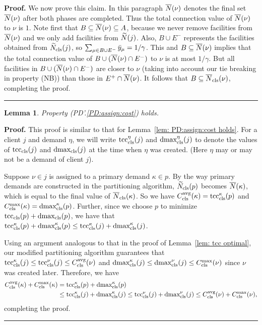 \documentclass[oneside,final]{ucr}
\newtheorem{lemma}[theorem]{Lemma}
\newenvironment{proof}[1][Proof]{\textbf{#1.} }{\ \rule{0.5em}{0.5em}}
\begin{document}
\begin{proof}
  We now prove this claim. In this paragraph $\wbarN(\nu)$ denotes the
  final set $\wbarN(\nu)$ after both phases are completed. Thus the total
connection value of $\wbarN(\nu)$ to $\nu$ is $1$.
	Note first that
  $B\subseteq \wbarN(\nu) \subseteq A$, because we never remove
  facilities from $\wbarN(\nu)$ and we only add facilities from
  $\wtildeN(j)$.  Also, $B\cup E^-$ represents the facilities obtained
  from $\wtildeclsnb(j)$, so $\sum_{\mu\in B\cup E^-} \bary_{\mu} =
  1/\gamma$.  This and $B\subseteq \wbarN(\nu)$ implies that the total
  connection value of $B\cup (\wbarN(\nu)\cap E^-)$ to $\nu$ is at
  most $1/\gamma$. But all facilities in $B\cup (\wbarN(\nu)\cap E^-)$
  are closer to $\nu$ (taking into account our tie breaking in property (NB))
 	than those in $E^+\cap \wbarN(\nu)$. It follows
  that $B\subseteq \wbarclsnb(\nu)$, completing the proof.
\end{proof}


\begin{lemma}\label{lem: PD1: primary optimal}
  Property (PD'.\ref{PD:assign:cost}) holds.
\end{lemma}
\begin{proof}
This proof is similar to that for Lemma~\ref{lem: PD:assign:cost holds}.
For a client $j$ and demand $\eta$, we will write
$\tcccls^\eta(j)$ and $\dmaxcls^\eta(j)$ to denote the values of
$\tcccls(j)$ and $\dmaxcls(j)$ at the time when $\eta$
was created. (Here $\eta$ may or may not be a demand of client $j$).

Suppose $\nu \in j$ is assigned to a primary demand $\kappa \in p$.
By the way primary demands are constructed in the partitioning
algorithm, $\wtildeclsnb(p)$ becomes $\wbarN(\kappa)$, which is equal
to the final value of $\wbarclsnb(\kappa)$. So we have
$\clsdist(\kappa) = \tcccls^\kappa (p)$ and $\clsmax(\kappa) =
\dmaxcls^\kappa(p)$. Further, since we choose $p$ to minimize
$\tcccls(p) + \dmaxcls(p)$, we have that $\tcccls^\kappa(p) +
\dmaxcls^\kappa(p) \leq \tcccls^\kappa(j) + \dmaxcls^\kappa(j)$.

Using an argument analogous to that in the proof of Lemma~\ref{lem: tcc optimal}, 
our modified partitioning algorithm guarantees that
  $\tcccls^{\kappa}(j) \leq \tcccls^{\nu}(j) \leq \clsdist(\nu)$ and
  $\dmaxcls^{\kappa}(j) \leq \dmaxcls^{\nu}(j) \leq \clsmax(\nu)$ since $\nu$ was
  created later.
  Therefore, we have
%
  \begin{align*}
    \clsdist(\kappa) + \clsmax(\kappa) &= \tcccls^{\kappa}(p) +	\dmaxcls^{\kappa}(p) 
					\\
					&\leq \tcccls^{\kappa}(j) + \dmaxcls^{\kappa}(j) 
					\leq \tcccls^{\nu}(j) + \dmaxcls^{\nu}(j) 
					\leq \clsdist(\nu) + \clsmax(\nu),
  \end{align*}
%
completing the proof.
\end{proof}
\end{document}
